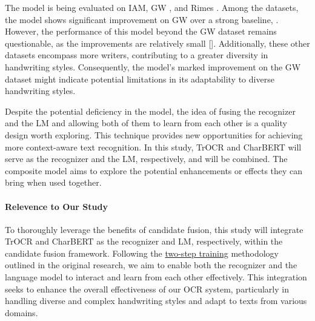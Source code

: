 The model is being evaluated on IAM, GW \citep{fischer2012lexicon}, and Rimes \citep{grosicki2011icdar}. Among the datasets, the model shows significant improvement on GW over a strong baseline, \cite{dutta2018improving}. However, the performance of this model beyond the GW dataset remains questionable, as the improvements are relatively small []. Additionally, these other datasets encompass more writers, contributing to a greater diversity in handwriting styles. Consequently, the model's marked improvement on the GW dataset might indicate potential limitations in its adaptability to diverse handwriting styles.

Despite the potential deficiency in the model, the idea of fusing the recognizer and the LM and allowing both of them to learn from each other is a quality design worth exploring. This technique provides new opportunities for achieving more context-aware text recognition. In this study, TrOCR and CharBERT will serve as the recognizer and the LM, respectively, and will be combined. The composite model aims to explore the potential enhancements or effects they can bring when used together.


\paragraph*{Relevence to Our Study}
To thoroughly leverage the benefits of candidate fusion, this study will integrate TrOCR and CharBERT as the recognizer and LM, respectively, within the candidate fusion framework. Following the \hyperlink{2_two_step}{two-step training} methodology outlined in the original research, we aim to enable both the recognizer and the language model to interact and learn from each other effectively. This integration seeks to enhance the overall effectiveness of our OCR system, particularly in handling diverse and complex handwriting styles and adapt to texts from various domains.

